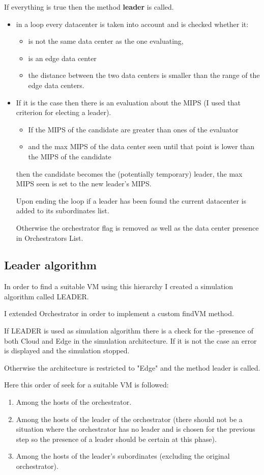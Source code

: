 \documentclass[12pt, a4paper]{report} %
\begin{document}
If everything is true then the method \textbf{leader} is called.
  	\begin{itemize}
 		\item in a loop every datacenter is taken into account and is checked whether it:
 		\begin{itemize}
 			\item is not the same data center as the one evaluating,
 			\item is an edge data center
 			\item the distance between the two data centers is smaller than the range of the edge data centers.
 		\end{itemize}
 		\item If it is the case then there is an evaluation about the MIPS (I used that criterion for electing a leader).
 		\begin{itemize}
 			\item If the MIPS of the candidate are greater than ones of the evaluator
 			\item and the max MIPS of the data center seen until that point is lower than the MIPS of the candidate
 		\end{itemize}

then the candidate becomes the (potentially temporary) leader, the max MIPS seen is set to the new leader's MIPS.

Upon ending the loop if a leader has been found the current datacenter is added to its subordinates list.
 		
Otherwise the orchestrator flag is removed as well as the data center presence in Orchestrators List.
  	\end{itemize}
\subsection*{Leader algorithm}
In order to find a suitable VM using this hierarchy I created a simulation algorithm called LEADER.

I extended Orchestrator in order to implement a custom findVM method.

If LEADER is used as simulation algorithm there is a check for the -presence of both Cloud and Edge in the simulation architecture. If it is not the case an error is displayed and the simulation stopped.

Otherwise the architecture is restricted to "Edge" and the method leader is called.

Here this order of seek for a suitable VM is followed:
\begin{enumerate}
	\item Among the hosts of the orchestrator.
	\item Among the hosts of the leader of the orchestrator (there should not be a situation where the orchestrator has no leader and is chosen for the previous step so the presence of a leader should be certain at this phase).
	\item Among the hosts of the leader's subordinates (excluding the original orchestrator).
\end{enumerate}
\end{document}
